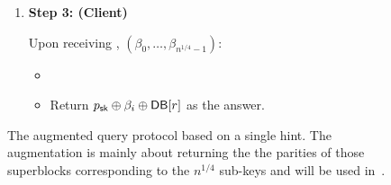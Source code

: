 \begin{figure}
\begin{minipage}{\textwidth}
\begin{mdframed}
\begin{enumerate}[leftmargin=5mm,itemsep=1pt]
\begin{enumerate}
                    \item Let $S_0,\dots,S_{n^{1/4}-1}\get \ListDecode(\sk')$;  
                    \item For $i\in \{0,\dots,n^{1/4}-1\}$:
                        
                        \begin{enumerate}
                            \item Let $\beta_i = \xor_{x\in S_i} \DB[x]$;
                            \item {}
                        \end{enumerate}

                    \item Return ,
                    $(\beta_0,\dots,\beta_{n^{1/4}-1})$ to the client.
                \end{enumerate}
                
                \item 
                {\bf Step 3: (Client)}
                
                Upon receiving ,
                $(\beta_0,\dots,\beta_{n^{1/4}-1})$:
                \begin{itemize}[leftmargin=5mm,itemsep=1pt]
                    \item {}
                    \item Return $p_{\mathsf{sk}} \oplus \beta_i \oplus \mathsf{DB}[r]$ as the answer.
                \end{itemize}
            \end{enumerate}
        \end{mdframed}
    \end{minipage}
    \caption{The augmented query protocol based on a single hint. The augmentation is mainly about returning the the parities of those superblocks corresponding to the $n^{1/4}$ sub-keys and will be used in~.}
    \label{fig:augmented}
\end{figure}








